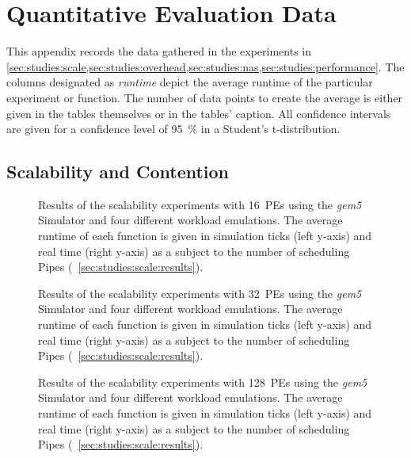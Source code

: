 \chapter{Quantitative Evaluation Data}%
\label{appendix:data}

This appendix records the data gathered in the experiments in \cref{sec:studies:scale,sec:studies:overhead,sec:studies:nas,sec:studies:performance}. The columns designated as \emph{runtime} depict the average runtime of the particular experiment or function. The number of data points to create the average is either given in the tables themselves or in the tables' caption. All confidence intervals are given for a confidence level of \SI{95}{\percent} in a Student's t-distribution.

\section{Scalability and Contention}%
\label{appendix:data:scale}

\begin{figure} \centering
	\caption[Results of the scalability experiments with 16~PEs.]{Results of the scalability experiments with 16~\acp{PE} using the \emph{gem5} Simulator and four different workload emulations. The average runtime of each function is given in simulation ticks (left y-axis) and real time (right y-axis) as a subject to the number of scheduling Pipes (\cf~\cref{sec:studies:scale:results}).}%
	\label{fig:eval:scale-gem5-16c}
\end{figure}

\begin{figure} \centering
	\caption[Results of the scalability experiments with 32~PEs.]{Results of the scalability experiments with 32~\acp{PE} using the \emph{gem5} Simulator and four different workload emulations. The average runtime of each function is given in simulation ticks (left y-axis) and real time (right y-axis) as a subject to the number of scheduling Pipes (\cf~\cref{sec:studies:scale:results}).}%
	\label{fig:eval:scale-gem5-32c}
\end{figure}

\begin{figure} \centering
	\caption[Results of the scalability experiments with 128~PEs.]{Results of the scalability experiments with 128~\acp{PE} using the \emph{gem5} Simulator and four different workload emulations. The average runtime of each function is given in simulation ticks (left y-axis) and real time (right y-axis) as a subject to the number of scheduling Pipes (\cf~\cref{sec:studies:scale:results}).}%
	\label{fig:eval:scale-gem5-128c}
\end{figure}

